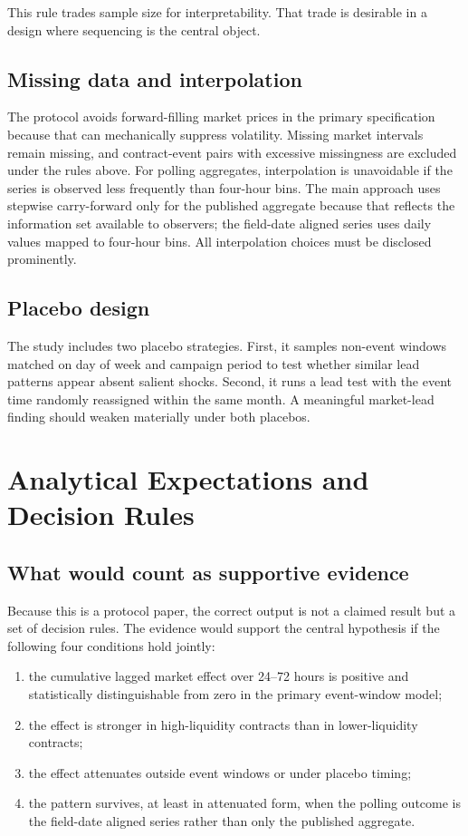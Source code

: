 \documentclass[11pt]{article}
\begin{document}
This rule trades sample size for interpretability. That trade is desirable in a design where sequencing is the central object.

\subsection{Missing data and interpolation}
The protocol avoids forward-filling market prices in the primary specification because that can mechanically suppress volatility. Missing market intervals remain missing, and contract-event pairs with excessive missingness are excluded under the rules above. For polling aggregates, interpolation is unavoidable if the series is observed less frequently than four-hour bins. The main approach uses stepwise carry-forward only for the published aggregate because that reflects the information set available to observers; the field-date aligned series uses daily values mapped to four-hour bins. All interpolation choices must be disclosed prominently.

\subsection{Placebo design}
The study includes two placebo strategies. First, it samples non-event windows matched on day of week and campaign period to test whether similar lead patterns appear absent salient shocks. Second, it runs a lead test with the event time randomly reassigned within the same month. A meaningful market-lead finding should weaken materially under both placebos.

\section{Analytical Expectations and Decision Rules}

\subsection{What would count as supportive evidence}
Because this is a protocol paper, the correct output is not a claimed result but a set of decision rules. The evidence would support the central hypothesis if the following four conditions hold jointly:
\begin{enumerate}
\item the cumulative lagged market effect over 24--72 hours is positive and statistically distinguishable from zero in the primary event-window model;
\item the effect is stronger in high-liquidity contracts than in lower-liquidity contracts;
\item the effect attenuates outside event windows or under placebo timing;
\item the pattern survives, at least in attenuated form, when the polling outcome is the field-date aligned series rather than only the published aggregate.
\end{enumerate}
\end{document}
